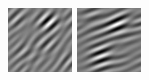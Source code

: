 \begin{figure}[ht]
\begin{center}
  \includegraphics[width=\columnwidth/9]{ch4/figures/real_2_2.jpg}
  \includegraphics[width=\columnwidth/9]{ch4/figures/real_2_3.jpg}

\end{center}
\end{figure}
